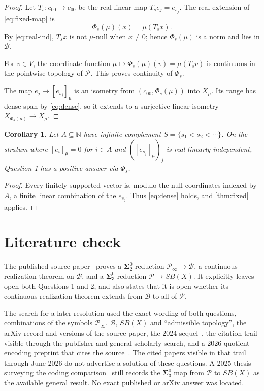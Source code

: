 \documentclass[11pt]{article}
\newtheorem{corollary}[theorem]{Corollary}
\theoremstyle{definition}
\newcommand{\Pcal}{\mathcal P}
\newcommand{\Bcal}{\mathcal B}
\newcommand{\N}{\mathbb N}
\newcommand{\SigmaTwo}{\boldsymbol{\Sigma}^{0}_{2}}
\begin{document}
\begin{proof}
Let $T_s:c_{00}\to c_{00}$ be the real-linear map $T_se_j=e_{s_j}$.
The real extension of \eqref{eq:fixed-map} is
\[
 \Phi_s(\mu)(x)=\mu(T_sx).
\]
By \eqref{eq:real-ind}, $T_sx$ is not $\mu$-null when $x\neq0$; hence
$\Phi_s(\mu)$ is a norm and lies in $\Bcal$.

For $v\in V$, the coordinate function
$\mu\mapsto\Phi_s(\mu)(v)=\mu(T_sv)$ is continuous in the pointwise topology of
$\Pcal$.  This proves continuity of $\Phi_s$.

The map $e_j\mapsto[e_{s_j}]_\mu$ is an isometry from
$(c_{00},\Phi_s(\mu))$ into $X_\mu$.  Its range has dense span by
\eqref{eq:dense}, so it extends to a surjective linear isometry
$X_{\Phi_s(\mu)}\to X_\mu$.
\end{proof}

\begin{corollary}\label{cor:fixed-zero}
Let $A\subseteq\N$ have infinite complement
$S=\{s_1<s_2<\cdots\}$.  On the stratum where $[e_i]_\mu=0$ for $i\in A$ and
$([e_{s_j}]_\mu)_j$ is real-linearly independent, Question 1 has a positive
answer via $\Phi_s$.
\end{corollary}

\begin{proof}
Every finitely supported vector is, modulo the null coordinates indexed by $A$,
a finite linear combination of the $e_{s_j}$.  Thus \eqref{eq:dense} holds, and
\cref{thm:fixed} applies.
\end{proof}

\section{Literature check}\label{sec:literature}

The published source paper~\cite{CDDK} proves a $\SigmaTwo$ reduction
$\Pcal_\infty\to\Bcal$, a continuous realization theorem on $\Bcal$, and a
$\boldsymbol\Sigma^0_3$ reduction $\Pcal\to SB(X)$.  It explicitly leaves open
both Questions 1 and 2, and also states that it is open whether its continuous
realization theorem extends from $\Bcal$ to all of $\Pcal$.

The search for a later resolution used the exact wording of both questions,
combinations of the symbols $\Pcal_\infty$, $\Bcal$, $SB(X)$ and
``admissible topology'', the arXiv record and versions of the source paper, the
2024 sequel~\cite{CDDK2}, the citation trail visible through the publisher and
general scholarly search, and a 2026 quotient-encoding preprint that cites the
source~\cite{Kania}.  The cited papers visible in that trail through June 2026
do not advertise a solution of these questions.  A 2025 thesis surveying the
coding comparison~\cite{Kaplan} still records the
$\boldsymbol\Sigma^0_3$ map from $\Pcal$ to $SB(X)$ as the available general
result.  No exact published or arXiv answer was located.
\end{document}
